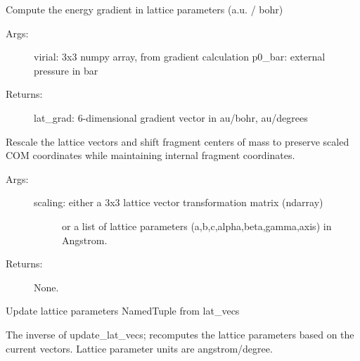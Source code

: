 \documentclass[letterpaper,10pt,english]{sphinxmanual}
\begin{document}
\begin{fulllineitems}
\label{\detokenize{globals:Globals.lattice.lattice_gradient}}
Compute the energy gradient in lattice parameters (a.u. / bohr)
\begin{description}
\item[{Args:}] \leavevmode
virial: 3x3 numpy array, from gradient calculation
p0\_bar: external pressure in bar

\item[{Returns:}] \leavevmode
lat\_grad: 6-dimensional gradient vector in au/bohr, au/degrees

\end{description}

\end{fulllineitems}


\begin{fulllineitems}
\label{\detokenize{globals:Globals.lattice.rescale}}
Rescale the lattice vectors and shift fragment centers of mass to
preserve scaled COM coordinates while maintaining internal fragment
coordinates.
\begin{description}
\item[{Args:}] \leavevmode\begin{description}
\item[{scaling: either a 3x3 lattice vector transformation matrix (ndarray)}] \leavevmode
or a list of lattice parameters (a,b,c,alpha,beta,gamma,axis) in
Angstrom.

\end{description}

\item[{Returns:}] \leavevmode
None.

\end{description}

\end{fulllineitems}


\begin{fulllineitems}
\label{\detokenize{globals:Globals.lattice.update_lat_params}}
Update lattice parameters NamedTuple from \sphinxquotedblleft{}lat\_vecs\sphinxquotedblright{}

The inverse of update\_lat\_vecs; recomputes the lattice parameters based on
the current vectors. Lattice parameter units are angstrom/degree.

\end{fulllineitems}
\end{document}

